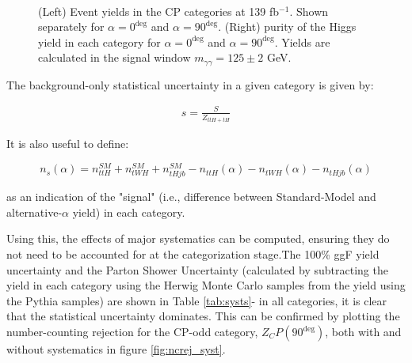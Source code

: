 \begin{figure}[htbp]
 \centering
         \\
  \caption{(Left) Event yields in the CP categories at 139 fb$^{-1}$. Shown separately for $\alpha = 0^{\deg}$ and $\alpha = 90^{\deg}$. (Right) purity of the Higgs yield in each category for $\alpha = 0^{\deg}$ and $\alpha = 90^{\deg}$. Yields are calculated in the signal window $m_{\gamma\gamma}=125\pm2$ GeV.}
  \label{fig:nominalb}
\end{figure}

The background-only statistical uncertainty in a given category is given by:

\begin{align}
s = \frac{S}{Z_{ttH+tH}}
\label{eq:statunc}
\end{align}

It is also useful to define:

\begin{equation}
n_{s}(\alpha) = n_{ttH}^{SM} + n_{tWH}^{SM} + n_{tHjb}^{SM} - n_{ttH}(\alpha) - n_{tWH}(\alpha) - n_{tHjb}(\alpha)
\end{equation}

as an indication of the "signal" (i.e., difference between Standard-Model and alternative-$\alpha$ yield) in each category. 

\begin{figure}
\end{figure}

Using this, the effects of major systematics can be computed, ensuring they do not need to be accounted for at the categorization stage.The 100\% ggF yield uncertainty and the Parton Shower Uncertainty (calculated by subtracting the yield in each category using the Herwig Monte Carlo samples from the yield using the Pythia samples) are shown in Table \ref{tab:systs}- in all categories, it is clear that the statistical uncertainty dominates. This can be confirmed by plotting the number-counting rejection for the CP-odd category, $Z_CP(90^{\deg})$, both with and without systematics in figure \ref{fig:ncrej_syst}. 



